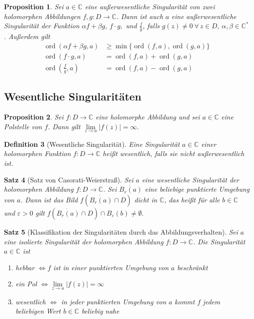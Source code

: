 \documentclass[a4paper,12pt]{article}
\renewcommand{\epsilon}{\varepsilon}
\theoremstyle{newthm}
\newtheorem{thm}{Satz}[subsection]
\newtheorem{prop}[thm]{Proposition}
\theoremstyle{newdef}
\newtheorem{defn}[thm]{Definition}
\theoremstyle{newrem}
\newcommand{\C}{\mathbb{C}}
\newcommand{\ord}[2]{\operatorname{ord} \left( #1,#2 \right)}
\begin{document}
		\begin{prop}
			Sei $ a \in \C $ eine außerwesentliche Singularität von zwei holomorphen Abbildungen $ f,g: D \to \C $. Dann ist auch $a$ eine außerwesentliche Singularität der Funktion $ \alpha f + \beta g,\ f \cdot g, $ und $ \frac{f}{g} $, falls $g(z) \neq 0 \ \forall\, z \in D,\ \alpha,\beta \in \C^*$.	Außerdem gilt
			\begin{align*}
				\ord{\alpha f + \beta g}{a} &\geq \min\{\ord{f}{a},\ord{g}{a}\}\\
				\ord{f\cdot g}{a} &= \ord{f}{a} + \ord{g}{a}\\
				\ord{\frac{f}{g}}{a} &= \ord{f}{a} - \ord{g}{a}
			\end{align*}
		\end{prop}
		
	
	\subsection{Wesentliche Singularitäten}
		
		\begin{prop}
			Sei $ f: D \to \C $ eine holomorphe Abbildung und sei $ a \in \C $ eine Polstelle von $f$. Dann gilt $ \lim\limits_{z\to a} |f(z)| = \infty. $
		\end{prop}
		
		\begin{defn}[Wesentliche Singularität]
			Eine Singularität $a \in \C$ einer holomorphen Funktion $f: D \to \C$ heißt \emph{wesentlich}, falls sie nicht außerwesentlich ist.
		\end{defn}
		
		\begin{thm}[Satz von Casorati-Weierstraß]
			Sei $a$ eine wesentliche Singularität der holomorphen Abbildung $f: D \to \C$. Sei $ \dot{B_r(a)} $ eine beliebige punktierte Umgebung von $a$. Dann ist das Bild $ f\left(\dot{B_r(a)} \cap D\right) $ dicht in $\C$, das heißt für alle $b \in \C$ und $\epsilon > 0$ gilt $ f\left( \dot{B_r(a)} \cap D\right) \cap B_\epsilon(b) \neq \emptyset. $
		\end{thm}
		
		\begin{thm}[Klassifikation der Singularitäten durch das Abbildungsverhalten]
			Sei $a$ eine isolierte Singularität der holomorphen Abbildung $f: D \to \C$. Die Singularität $a \in \C$ ist
			\begin{enumerate}[label={\roman*})]
				\item hebbar $\iff f$ ist in einer punktierten Umgebung von $a$ beschränkt
				\item ein Pol $\iff \lim\limits_{z\to a}|f(z)| = \infty$
				\item wesentlich $\iff$ in jeder punktierten Umgebung von $a$ kommt $f$ jedem beliebigen Wert $b \in \C$ beliebig nahe
			\end{enumerate}
		\end{thm}
	
\end{document}
